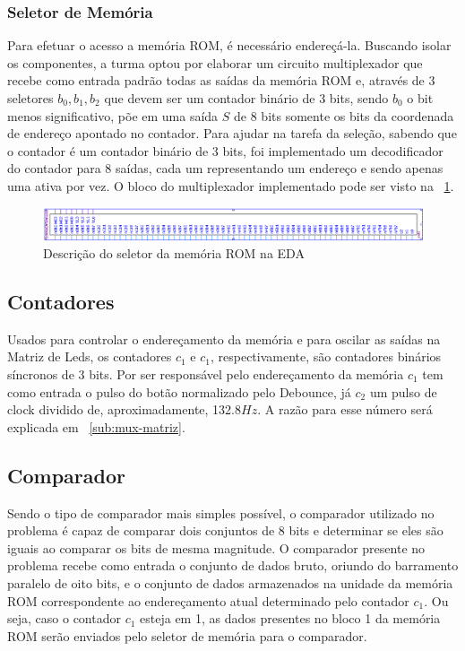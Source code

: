 \documentclass[12pt]{article}
\begin{document}
\subsubsection{Seletor de Memória}
Para efetuar o acesso a memória ROM, é necessário endereçá-la. Buscando isolar os componentes, a turma optou por elaborar um circuito multiplexador que recebe como entrada padrão todas as saídas da memória ROM e, através de 3 seletores $b_{0}, b_{1}, b_{2}$ que devem ser um contador binário de 3 bits, sendo $b_{0}$ o bit menos significativo, põe em uma saída $S$ de 8 bits somente os bits da coordenada de endereço apontado no contador. Para ajudar na tarefa da seleção, sabendo que o contador é um contador binário de 3 bits, foi implementado um decodificador do contador para 8 saídas, cada um representando um endereço e sendo apenas uma ativa por vez. O bloco do multiplexador implementado pode ser visto na ~\ref{fig:mux-mem}.

\begin{figure}[H]
\centering
\includegraphics[width=.9\textwidth]{img/mem-mux.png}
\caption{Descrição do seletor da memória ROM na EDA}
\label{fig:mux-mem}
\end{figure}

\subsection{Contadores}

Usados para controlar o endereçamento da memória e para oscilar as saídas na Matriz de Leds, os contadores $c_{1}$ e $c_{1}$, respectivamente, são contadores binários síncronos de 3 bits. Por ser responsável pelo endereçamento da memória $c_{1}$ tem como entrada o pulso do botão normalizado pelo Debounce, já $c_{2}$ um pulso de clock dividido de, aproximadamente, 132.8$Hz$. A razão para esse número será explicada em ~\ref{sub:mux-matriz}. 

\subsection{Comparador}
Sendo o tipo de comparador mais simples possível, o comparador utilizado no problema é capaz de comparar dois conjuntos de 8 bits e determinar se eles são iguais ao comparar os bits de mesma magnitude. O comparador presente no problema recebe como entrada o conjunto de dados bruto, oriundo do barramento paralelo de oito bits, e  o conjunto de dados armazenados na unidade da memória ROM correspondente ao endereçamento atual determinado pelo contador $c_{1}$. Ou seja, caso o contador $c_{1}$ esteja em 1, as dados presentes no bloco 1 da memória ROM serão enviados pelo seletor de memória para o comparador.
\end{document}
